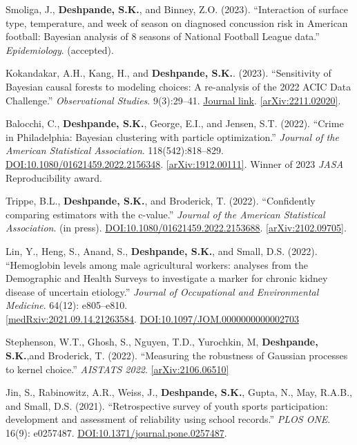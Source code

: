 \documentclass[margin]{res}
\def\skd{\textbf{Deshpande, S.K.}}
\begin{document}
\begin{resume}
Smoliga, J., \skd, and Binney, Z.O. (2023). ``Interaction of surface type, temperature, and week of season on diagnosed concussion risk in American football: {Bayesian} analysis of 8 seasons of National Football League data.'' \textit{Epidemiology}. (accepted).

Kokandakar, A.H., Kang, H., and \skd. (2023). ``Sensitivity of Bayesian causal forests to modeling choices: A re-analysis of the 2022 ACIC Data Challenge.'' \textit{Observational Studies}. 9(3):29--41. \href{https://muse.jhu.edu/pub/56/article/895651}{Journal link}. \href{https://arxiv.org/abs/2211.02020}{[arXiv:2211.02020]}.

Balocchi, C., \skd, George, E.I., and Jensen, S.T. (2022). ``Crime in Philadelphia: Bayesian clustering with particle optimization.'' \textit{Journal of the American Statistical Association}. 118(542):818--829.
\href{https://doi.org/10.1080/01621459.2022.2156348}{DOI:10.1080/01621459.2022.2156348}. \href{https://arxiv.org/abs/1912.00111}{[arXiv:1912.00111]}. Winner of 2023 \textit{JASA} Reproducibility award.

Trippe, B.L., \skd, and Broderick, T. (2022). ``Confidently comparing estimators with the c-value.'' \textit{Journal of the American Statistical Association}. (in press). \href{https://doi.org/10.1080/01621459.2022.2153688}{DOI:10.1080/01621459.2022.2153688}. \href{https://arxiv.org/abs/2102.09705}{[arXiv:2102.09705]}. 

Lin, Y., Heng, S., Anand, S., \skd, and Small, D.S. (2022). ``Hemoglobin levels among male agricultural workers: analyses from the Demographic and Health Surveys to investigate a marker for chronic kidney disease of uncertain etiology.'' \textit{Journal of Occupational and Environmental Medicine}. 64(12): e805--e810. \\ \href{https://www.medrxiv.org/content/10.1101/2021.09.14.21263584v2}{[medRxiv:2021.09.14.21263584}. \href{https://doi.org/10.1097/JOM.0000000000002703}{DOI:10.1097/JOM.0000000000002703}

Stephenson, W.T., Ghosh, S., Nguyen, T.D., Yurochkin, M, \skd,and Broderick, T. (2022). ``Measuring the robustness of Gaussian processes to kernel choice.'' \textit{AISTATS 2022}. \href{https://arxiv.org/abs/2106.06510}{[arXiv:2106.06510]}

Jin, S., Rabinowitz, A.R., Weiss, J., \skd, Gupta, N., May, R.A.B., and Small, D.S. (2021). ``Retrospective survey of youth sports participation: development and assessment of reliability using school records.'' \textit{PLOS ONE}. 16(9): e0257487. \href{https://doi.org/10.1371/journal.pone.0257487}{DOI:10.1371/journal.pone.0257487}.


\end{resume}
\end{document}
